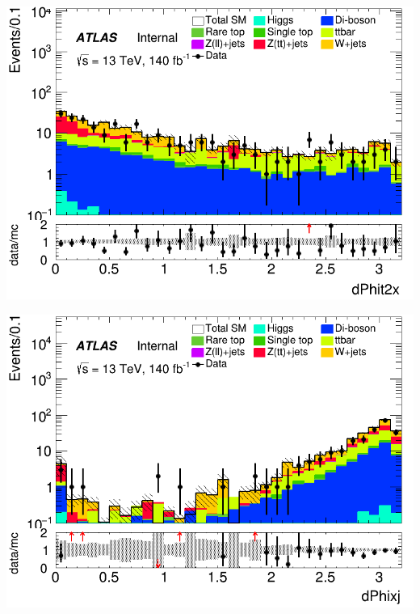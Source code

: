 \documentclass[usenames,dvipsnames]{beamer}
\begin{document}
\begin{frame}
    \begin{minipage}{0.32\textwidth}
        \centering
        \includegraphics[width=\textwidth]{graphics/LHH_met/LHH_met_dPhit2x.png}
    \end{minipage}
    \hfill
    \begin{minipage}{0.32\textwidth}
        \centering
        \includegraphics[width=\textwidth]{graphics/LHH_met/LHH_met_dPhixj.png}
    \end{minipage}
    \hfill
    \begin{minipage}{0.32\textwidth}
        \centering

\end{minipage}
\end{frame}
\end{document}
